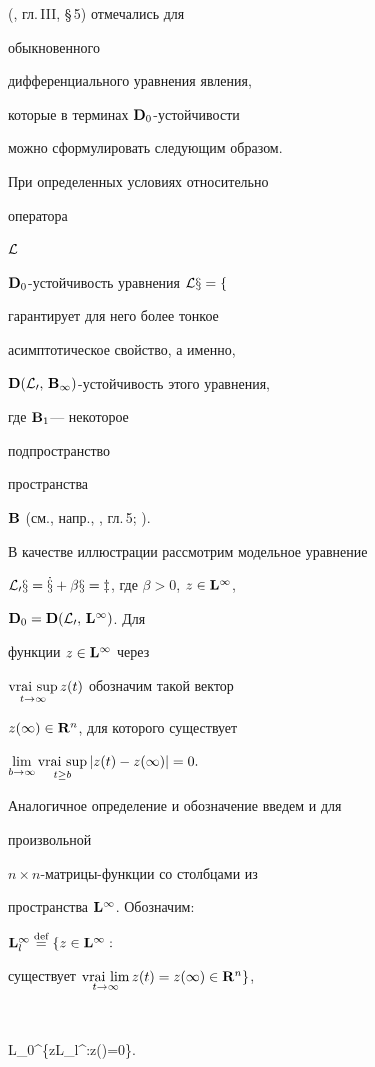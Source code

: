 (\cite{Bar}, гл.\,III, \S\,5) отмечались для


обыкновенного


дифференциального уравнения явления,


которые в терминах $\bold D_0$-устойчивости


можно сформулировать следующим образом.


При определенных условиях относительно


оператора


$\cal L$


$\bold D_0$-устойчивость уравнения $\cal L x=f$


гарантирует для него более тонкое


асимптотическое свойство, а именно,


$\bold D(\cal L_0,\,\bold B_1)$-устойчивость этого уравнения,


где $\bold B_1$--- некоторое


подпространство


пространства


$\bold B$ (см., напр., \cite{Kur}, гл.\,5; \cite{Az6}).





В качестве иллюстрации рассмотрим модельное уравнение


$\cal L_0x=\Dot x+\beta x=z$, где $\beta > 0$, $z\in\bold L^\infty$,


$\bold D_0=\bold D(\cal L_0,\,\bold L^\infty)$. Для


функции $z\in\bold L^\infty$ через


$\vraisup\limits_{t\to\infty} z(t)$ обозначим такой вектор


$z(\infty)\in\bold R^n$, для которого существует


$\lim\limits_{b\to\infty}\vraisup\limits_{t\ge b}|z(t)-z(\infty)| = 0.$


Аналогичное определение и обозначение введем и для


произвольной


$n\times n$-матрицы-функции со столбцами из


пространства $\bold L^\infty$. Обозначим:


$\bold L_l^\infty\overset{\text{def}}{=}\{z\in\bold L^\infty:$


существует $\vrailim\limits_{t\to\infty}z(t)=z(\infty)


\in\spc R^n\}$,


$$


\spc L_0^\infty\eqdef\{z\in\spc L_l^\infty:z(\infty)=0\}.


